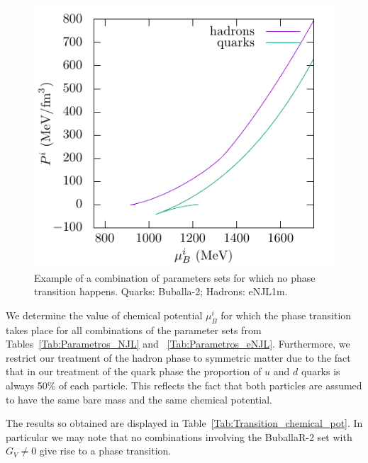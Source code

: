 \documentclass[prc, reprint, amsmath, floatfix,10pt]{revtex4-1}
\begin{document}
\begin{figure}
	\includegraphics[width=\linewidth]{graph/Buballa_2-eNJL1m-quark-hadron_phase_transition.pdf}
	\caption{Example of a combination of parameters sets for which no phase transition happens. Quarks: Buballa-2; Hadrons: eNJL1m. \label{Fig:NoIntersection}}
\end{figure}


We determine the value of chemical potential $\mu_B^i$ for which the
phase transition takes place for all combinations of the parameter
sets from Tables~\ref{Tab:Parametros_NJL}  and ~\ref{Tab:Parametros_eNJL}. Furthermore, we restrict our treatment of the hadron phase to symmetric matter due to the fact that in our treatment of the quark phase the proportion of $u$ and $d$ quarks is always 50\% of each particle. This reflects the fact that both particles are assumed to have the same bare mass and the same chemical potential.

The results so obtained are displayed in
Table~\ref{Tab:Transition_chemical_pot}. In particular we may note
that no combinations involving the BuballaR-2 set with 
$G_V \neq 0$ give rise to a phase transition. 
\end{document}
